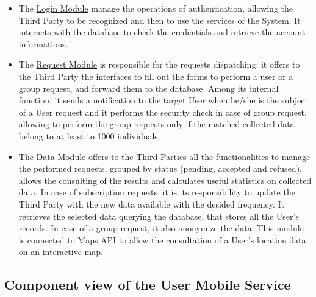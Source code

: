 \begin{itemize}
\item  The \underline{Login Module} manage the operations of authentication, allowing the Third Party to be recognized and then to use the services of the System. It interacts with the database to check the credentials and retrieve the account informations.

\item The \underline{Request Module} is responsible for the requests dispatching: it offers to the Third Party the interfaces to fill out the forms to perform a user or a group request, and forward them to the database. Among its internal function, it sends a notification to the target User when he/she is the subject of a User request and it performs the security check in case of group request, allowing to perform the group requests only if the matched collected data belong to at least to 1000 individuals.
    
\item The \underline{Data Module} offers to the Third Parties all the functionalities to manage the performed requests, grouped by status (pending, accepted and refused), allows the consulting of the results and calculates useful statistics on collected data. In case of subscription requests, it is its responsibility to update the Third Party with the new data available with the desided frequency. It retrieves the selected data querying the database, that stores all the User's records. In case of a group request, it also anonymize the data. This module is connected to Maps API to allow the consultation of a User's location data on an interactive map.
    
\end{itemize} 
   
\subsection{Component view of the User Mobile Service}

